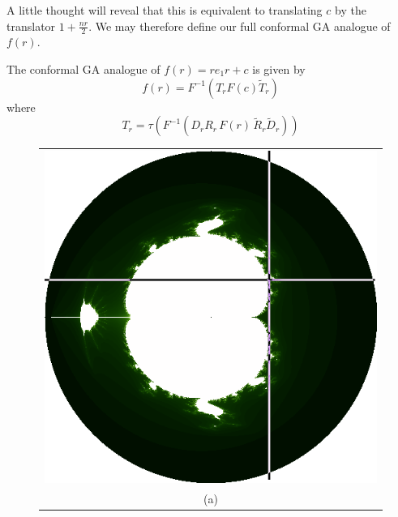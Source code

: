 \begin{enumarate}
A little thought will reveal that this is equivalent to translating $c$ by the translator
$1 + \frac{nr}{2}$. We may therefore define our full conformal GA analogue of $f(r)$.

\begin{definition}
The conformal GA analogue of $f(r) = re_1r + c$ is given by
\[
f(r) = F^{-1}(T_r F(c) \tilde{T}_r)
\]
where
\[
T_r = \tau(F^{-1}(D_r R_r\,F(r)\,\tilde{R}_r \tilde{D}_r))
\]
\end{definition}

\begin{figure}[p]
\centering
\begin{tabular}{c}
\includegraphics[width=0.35\textheight]{hyp_mandel_julia_pos} \\ (a) \\

\end{tabular}
\end{figure}
\end{enumarate}
